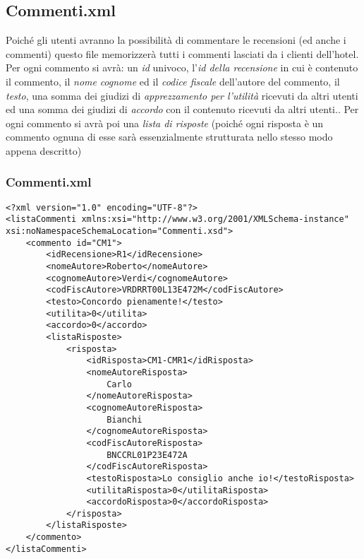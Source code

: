 \documentclass [a4paper, 12pt]{book}
\begin{document}
\subsection{Commenti.xml}
Poiché gli utenti avranno la possibilità di commentare le recensioni (ed anche i commenti) questo file memorizzerà tutti i commenti lasciati da i clienti dell'hotel. Per ogni commento si avrà: un \textit{id} univoco, l'\textit{id della recensione} in cui è contenuto il commento, il \textit{nome} \textit{cognome} ed il \textit{codice fiscale} dell'autore del commento, il \textit{testo}, una somma dei giudizi di \textit{apprezzamento per l'utilità} ricevuti da altri utenti ed una somma dei giudizi di \textit{accordo} con il contenuto ricevuti da altri utenti.. Per ogni commento si avrà poi una \textit{lista di risposte} (poiché ogni risposta è un commento ognuna di esse sarà essenzialmente strutturata nello stesso modo appena descritto)

\subsubsection{Commenti.xml}
\begin{lstlisting}[style=XML]
<?xml version="1.0" encoding="UTF-8"?>
<listaCommenti xmlns:xsi="http://www.w3.org/2001/XMLSchema-instance" xsi:noNamespaceSchemaLocation="Commenti.xsd">
    <commento id="CM1">
        <idRecensione>R1</idRecensione>
        <nomeAutore>Roberto</nomeAutore>
        <cognomeAutore>Verdi</cognomeAutore>
        <codFiscAutore>VRDRRT00L13E472M</codFiscAutore>
        <testo>Concordo pienamente!</testo>
        <utilita>0</utilita>
        <accordo>0</accordo>
        <listaRisposte>
            <risposta>
            	<idRisposta>CM1-CMR1</idRisposta>
                <nomeAutoreRisposta>
                	Carlo
                </nomeAutoreRisposta>
                <cognomeAutoreRisposta>
                	Bianchi
                </cognomeAutoreRisposta>
                <codFiscAutoreRisposta>
                	BNCCRL01P23E472A
                </codFiscAutoreRisposta>
                <testoRisposta>Lo consiglio anche io!</testoRisposta>
                <utilitaRisposta>0</utilitaRisposta>
                <accordoRisposta>0</accordoRisposta>
            </risposta>
        </listaRisposte>
    </commento>
</listaCommenti>
\end{lstlisting}
\end{document}
